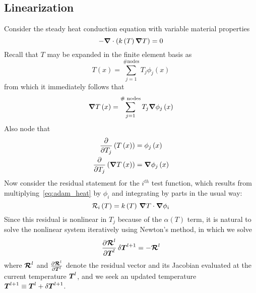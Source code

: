 \subsection{Linearization}
Consider the steady heat conduction equation with variable material properties
\begin{equation}
  \label{eq:adam_heat}
 -{\boldsymbol{\nabla}} {}\cdot\left(k\left(T\right) {\boldsymbol{\nabla}} {T}\right) = 0
\end{equation}
Recall that $T$ may be expanded in the finite element basis as
\begin{equation}
  T\left(x\right) = \sum_{j=1}^{\text{\# nodes}} T_j \phi_j\left(x\right)
\end{equation}
from which it immediately follows that 
\begin{equation}
  {\boldsymbol{\nabla}} {T}\left(x\right) = \sum_{j=1}^{\text{\# nodes}} T_j {\boldsymbol{\nabla}} {\phi}_j\left(x\right)
\end{equation}
Also node that
\begin{align}  
  {\frac{\partial{}}{\partial{T_j}}}\left(T\left(x\right)\right) &= \phi_j\left(x\right) \label{eq:adam_dT} \\
  {\frac{\partial{}}{\partial{T_j}}}\left({\boldsymbol{\nabla}} {T}\left(x\right)\right) &= {\boldsymbol{\nabla}} {\phi_j}\left(x\right) \label{eq:adam_dgradT} \\
\end{align}
Now consider the residual statement for the $i^{th}$ test function, which results from multiplying~\eqref{eq:adam_heat} by $\phi_i$ and integrating by parts in the usual way:
\begin{equation}
  \mathcal{R}_i\left(T\right) = k\left(T\right)\,{\boldsymbol{\nabla}} {T}\cdot{\boldsymbol{\nabla}} {\phi}_i
\end{equation}
Since this residual is nonlinear in $T_j$ because of the $\alpha\left(T\right)$ term, it is natural to solve the nonlinear system iteratively using Newton's method, in which we solve
\begin{equation}
  {\frac{\partial{{\boldsymbol{\mathcal{R}}}^l}}{\partial{{\boldsymbol{T}}^l}}}\, \delta{\boldsymbol{T}}^{l+1} = -{\boldsymbol{\mathcal{R}}}^{l}
\end{equation}
where ${\boldsymbol{\mathcal{R}}}^l$ and ${\frac{\partial{{\boldsymbol{\mathcal{R}}}^l}}{\partial{{\boldsymbol{T}}^l}}}$ denote the residual vector and its Jacobian evaluated at the current temperature ${\boldsymbol{T}}^l$, and we seek an updated temperature ${\boldsymbol{T}}^{l+1} \equiv {\boldsymbol{T}}^l + \delta{\boldsymbol{T}}^{l+1}$.

